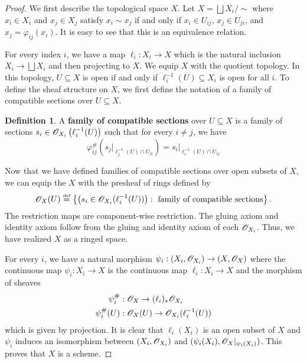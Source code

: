 \documentclass[]{pcmi}
\theoremstyle{plain}
\theoremstyle{definition}
\newtheorem{Definition}[equation]{Definition}
\theoremstyle{remark}
\begin{document}
\begin{proof}
    We first describe the topological space $X$. Let $X = \bigsqcup X_i / \sim$ where $x_i \in X_i$ and $x_j \in X_j$ satisfy $x_i \sim x_j$ if and only if $x_i \in U_{ij}$, $x_j \in U_{ji}$, and $x_j = \varphi_{ij}(x_i)$. It is easy to see that this is an equivalence relation. 

    For every index $i$, we have a map $\ell_i : X_i \to X$ which is the natural inclusion $X_i \to \bigsqcup X_i$ and then projecting to $X$. We equip $X$ with the quotient topology. In this topology, $U \subseteq X$ is open if and only if $\ell_i^{-1}(U) \subseteq X_i$ is open for all $i$. To define the sheaf structure on $X$, we first define the notation of a family of compatible sections over $U \subseteq X$. 
    \begin{Definition}
        A \textbf{family of compatible sections} over $U \subseteq X$ is a family of sections $s_i \in \mathscr{O}_{X_i} \left( \ell_i^{-1}(U) \right)$ such that for every $i \neq j$, we have 
        \[
            \varphi_{ij}^{\#} \left( s_j |_{\ell_j^{-1}(U) \cap U_{ji}} \right) = s_i|_{\ell_i^{-1}(U) \cap U_{ij}}
        \]
    \end{Definition}
    Now that we have defined families of compatible sections over open subsets of $X$, we can equip the $X$ with the presheaf of rings defined by
    \[
        \mathscr{O}_X (U) \overset{\textup{\tiny def}}= \left\{ \left( s_i \in \mathscr{O}_{X_i}(\ell_i^{-1}(U)) \right) : \text{ family of compatible sections} \right\}.
    \]
    The restriction maps are component-wise restriction. The gluing axiom and identity axiom follow from the gluing and identity axiom of each $\mathscr{O}_{X_i}$. Thus, we have realized $X$ as a ringed space.

    For every $i$, we have a natural morphism $\psi_i : \left( X_i, \mathscr{O}_{X_i} \right) \to \left( X, \mathscr{O}_X \right)$ where the continuous map $\psi_i : X_i \to X$ is the continuous map $\ell_i : X_i \to X$ and the morphism of sheaves 
    \begin{align*}
        \psi_i^{\#} & : \mathscr{O}_X \to (\ell_i)_* \mathscr{O}_{X_i} \\
        \psi_i^{\#}(U) & : \mathscr{O}_X(U) \to \mathscr{O}_{X_i}(\ell_i^{-1}(U))
    \end{align*}
    which is given by projection. It is clear that $\ell_i(X_i)$ is an open subset of $X$ and $\psi_i$ induces an isomorphism between $(X_i, \mathscr{O}_{X_i})$ and $(\psi_i(X_i), \mathscr{O}_X|_{\psi_i(X_i)})$. This proves that $X$ is a scheme.      
\end{proof}
\end{document}
